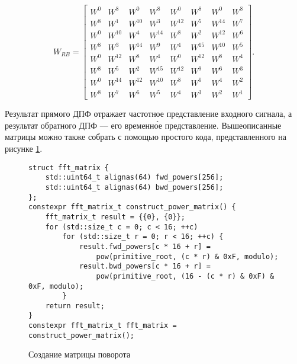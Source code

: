 $$
W_{RB} =
\begin{bmatrix}
W^0 &   W^8  &   W^0  &   W^8  &   W^0  &   W^8  &   W^0  &   W^8  \\
W^8 &   W^1  & W^{10} &   W^3  & W^{12} &   W^5  & W^{14} &   W^7  \\
W^0 & W^{10} &   W^4  & W^{14} &   W^8  &   W^2  & W^{12} &   W^6  \\
W^8 &   W^3  & W^{14} &   W^9  &   W^4  & W^{15} & W^{10} &   W^5  \\
W^0 & W^{12} &   W^8  &   W^4  &   W^0  & W^{12} &   W^8  &   W^4  \\
W^8 &   W^5  &   W^2  & W^{15} & W^{12} &   W^9  &   W^6  &   W^3  \\
W^0 & W^{14} & W^{12} & W^{10} &   W^8  &   W^6  &   W^4  &   W^2  \\
W^8 &   W^7  &   W^6  &   W^5  &   W^4  &   W^3  &   W^2  &   W^1
\end{bmatrix}.
$$

Результат прямого ДПФ отражает частотное представление входного сигнала, а результат обратного ДПФ --– его временн\'{о}е представление.
Вышеописанные матрицы можно также собрать с помощью простого кода, представленного на рисунке \ref{fig: rotation matrix creation}.
\begin{figure}
\begin{lstlisting}[language={[11]C++}]
struct fft_matrix {
	std::uint64_t alignas(64) fwd_powers[256];
	std::uint64_t alignas(64) bwd_powers[256];
};
constexpr fft_matrix_t construct_power_matrix() {
	fft_matrix_t result = {{0}, {0}};
	for (std::size_t c = 0; c < 16; ++c)
		for (std::size_t r = 0; r < 16; ++c) {
			result.fwd_powers[c * 16 + r] =
				pow(primitive_root, (c * r) & 0xF, modulo);
			result.bwd_powers[c * 16 + r] =
				pow(primitive_root, (16 - (c * r) & 0xF) & 0xF, modulo);
		}
	return result;
}
constexpr fft_matrix_t fft_matrix = construct_power_matrix();
\end{lstlisting}
\caption{Создание матрицы поворота}
\label{fig: rotation matrix creation}
\end{figure}

